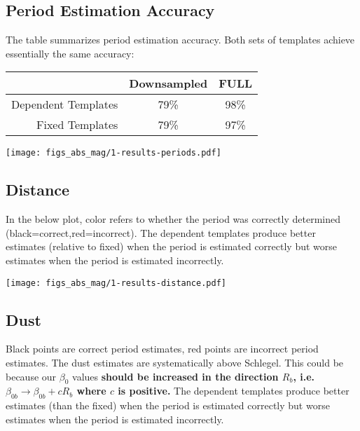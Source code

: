 \documentclass[12pt]{article}
\begin{document}
\subsection{Period Estimation Accuracy}
The table summarizes period estimation accuracy. Both sets of templates achieve essentially the same accuracy:

\begin{center}
\begin{tabular}{ r | c | c }
& Downsampled & FULL \\
  \hline
  Dependent Templates & 79\% & 98\%\\ 
  Fixed Templates & 79\% & 97\%\\ 
  \hline 
\end{tabular}
\end{center}


\begin{center}
  \texttt{[image: figs\_abs\_mag/1-results-periods.pdf]}
\end{center}



\subsection{Distance}

In the below plot, color refers to whether the period was correctly determined (black=correct,red=incorrect). The dependent templates produce better estimates (relative to fixed) when the period is estimated correctly but worse estimates when the period is estimated incorrectly.

\begin{center}
  \texttt{[image: figs\_abs\_mag/1-results-distance.pdf]}
\end{center}


\subsection{Dust}

Black points are correct period estimates, red points are incorrect period estimates. The dust estimates are systematically above Schlegel. This could be because our $\beta_{0}$ values \textbf{should be increased in the direction $R_b$, i.e. $\beta_{0b} \rightarrow \beta_{0b} + cR_b$ where $c$ is positive.}  The dependent templates produce better estimates (than the fixed) when the period is estimated correctly but worse estimates when the period is estimated incorrectly.
\end{document}
